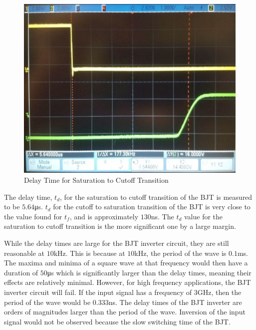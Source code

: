 \FloatBarrier
\begin{figure}[h!]
	\centering
	\includegraphics[scale=0.26]{../images/inverter_td.jpeg}
	\caption{Delay Time for Saturation to Cutoff Transition}
	\label{fig:inverter_td}
\end{figure}
\FloatBarrier

The delay time, $t_d$, for the saturation to cutoff transition of the BJT is measured to be $5.64$\si{\micro\second}. $t_d$ for the cutoff to saturation transition of the BJT is very close to the value found for $t_f$, and is approximately $130$\si{\nano\second}. The $t_d$ value for the saturation to cutoff transition is the more significant one by a large margin.

While the delay times are large for the BJT inverter circuit, they are still reasonable at $10$\si{\kilo\hertz}. This is because at $10$\si{\kilo\hertz}, the period of the wave is $0.1$\si{\milli\second}. The maxima and minima of a square wave at that frequency would then have a duration of $50$\si{\micro\second} which is significantly larger than the delay times, meaning their effects are relatively minimal. However, for high frequency applications, the BJT inverter circuit will fail. If the input signal has a frequency of $3$\si{\giga\hertz}, then the period of the wave would be $0.333$\si{\nano\second}. The delay times of the BJT inverter are orders of magnitudes larger than the period of the wave. Inversion of the input signal would not be observed because the slow switching time of the BJT.